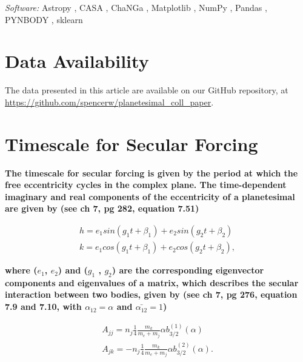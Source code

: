 \documentclass[fleqn,usenatbib]{mnras}
\begin{document}
\textit{Software:} Astropy \citep{2013A&A...558A..33A}, {\sc CASA} \citep{2007ASPC..376..127M}, {\sc ChaNGa} \citep{2008IEEEpds...ChaNGa, 2015AphCom..2..1}, Matplotlib \citep{2007CSE.....9...90H}, NumPy \citep{2011CSE....13b..22V}, Pandas \citep{mckinney-proc-scipy-2010}, {\sc PYNBODY} \citep{2013ascl.soft05002P}, {\sc sklearn} \citep{scikit-learn}

\section*{Data Availability}
The data presented in this article are available on our GitHub repository, at \url{https://github.com/spencerw/planetesimal_coll_paper}.




\appendix
\section{Timescale for Secular Forcing}\label{sec:sec_forcing_timescale}

\textbf{The timescale for secular forcing is given by the period at which the free eccentricity cycles in the complex plane. The time-dependent imaginary and real components of the eccentricity of a planetesimal are given by \citet{1999ssd..book.....M} (see ch 7, pg 282, equation 7.51)}

\begin{eqnarray}\label{eq:kandh}
	h = e_{1} sin (g_{1} t + \beta_{1}) + e_{2} sin (g_{2} t + \beta_{2}) \\ \nonumber
	k = e_{1} cos (g_{1} t + \beta_{1}) + e_{2} cos (g_{2} t + \beta_{2}),
\end{eqnarray}

\noindent \textbf{where  ($e_{1}$, $e_{2}$) and ($g_{1}$ , $g_{2}$) are the corresponding eigenvector components and eigenvalues of a matrix, which describes the secular interaction between two bodies, given by \citet{1999ssd..book.....M} (see ch 7, pg 276, equation 7.9 and 7.10, with $\alpha_{12} = \alpha$ and $\bar{\alpha_{12}} = 1$)}

\begin{eqnarray}\label{eq:pert_matrix}
	A_{jj} = n_{j} \frac{1}{4} \frac{m_{k}}{m_{c} + m_{j}} \alpha b_{3/2}^{(1)} (\alpha) \\ \nonumber
	A_{jk} = -n_{j} \frac{1}{4} \frac{m_{k}}{m_{c} + m_{j}} \alpha b_{3/2}^{(2)} (\alpha).
\end{eqnarray}
\end{document}
